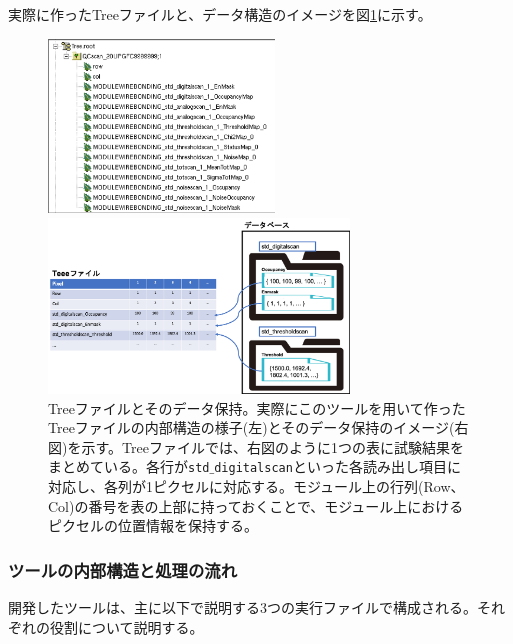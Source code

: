 実際に作ったTreeファイルと、データ構造のイメージを図\ref{analysis_tool_tree}に示す。

\begin{figure}[bpt]
  \begin{minipage}{0.4\hsize}
    \begin{center}
    \includegraphics[width=6cm]{analysis_tool_tree_file}
    \end{center}
  \end{minipage}
  \begin{minipage}{0.4\hsize}
    \begin{center}
    \includegraphics[width=8cm]{analysis_tool_tree_image}
    \end{center}
  \end{minipage}
  \caption[Treeファイルとそのデータ保持]{Treeファイルとそのデータ保持。実際にこのツールを用いて作ったTreeファイルの内部構造の様子(左)とそのデータ保持のイメージ(右図)を示す。Treeファイルでは、右図のように1つの表に試験結果をまとめている。各行が\texttt{std$\_$digitalscan}といった各読み出し項目に対応し、各列が1ピクセルに対応する。モジュール上の行列(Row、Col)の番号を表の上部に持っておくことで、モジュール上におけるピクセルの位置情報を保持する。}
  \label{analysis_tool_tree}
\end{figure}

\subsubsection{ツールの内部構造と処理の流れ}
開発したツールは、主に以下で説明する3つの実行ファイルで構成される。それぞれの役割について説明する。

